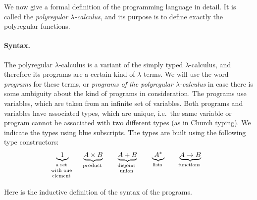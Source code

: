 We now  give a formal definition of the  programming language in detail. It is called the \emph{polyregular $\lambda$-calculus}, and its purpose is to define exactly the polyregular functions. 

\paragraph*{Syntax.} The polyregular $\lambda$-calculus is a variant of the simply typed $\lambda$-calculus, and therefore its programs are a certain kind of $\lambda$-terms. We will use the word \emph{programs} for these terms, or \emph{programs of the polyregular $\lambda$-calculus} in case there is some ambiguity about the kind of programs in consideration.   The programs use variables, which are taken from an infinite set of variables. Both programs and variables have associated types, which are unique, i.e.~the same variable or  program cannot be associated with two different types (as in Church typing). We indicate the types using blue subscripts. The types  are built using the following type constructors: 
\begin{align*}
    \myunderbrace{1}{a set \\ with one \\ element}
    \qquad 
    \myunderbrace{A \times B}{product} \qquad 
    \myunderbrace{A + B}{disjoint\\ union} \qquad 
    \myunderbrace{A^*}{lists} \qquad 
    \myunderbrace{A \to B}{functions}
\end{align*}

Here is the inductive definition of the syntax  of the programs.

